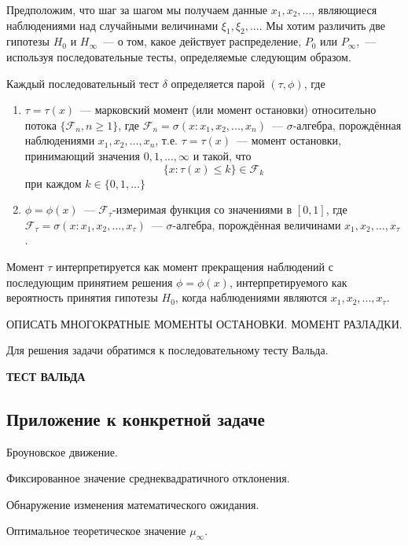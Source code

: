 \documentclass[a4paper,14pt]{article}
\begin{document}
Предположим, что шаг за шагом мы получаем данные $x_1, x_2, ...$, являющиеся наблюдениями над случайными величинами $\xi_1, \xi_2, ...$. Мы хотим различить две гипотезы $H_0$ и $H_\infty$~--- о том, какое действует распределение, $P_0$ или $P_\infty$,~--- используя последовательные тесты, определяемые следующим образом. 

Каждый последовательный тест $\delta$ определяется парой $(\tau, \phi)$, где 

\begin{enumerate}
  \item $\tau = \tau(x)$~--- марковский момент (или момент остановки) относительно потока $\{\mathcal{F}_n, n \ge 1\}$, где $\mathcal{F}_n = \sigma(x: x_1, x_2, ..., x_n)$~--- $\sigma$-алгебра, порождённая наблюдениями $x_1, x_2, ..., x_n$, т.е. $\tau = \tau(x)$~--- момент остановки, принимающий значения $0, 1, ..., \infty$ и такой, что 
  \begin{displaymath}
    \{x: \tau(x) \le k\} \in \mathcal{F}_k
  \end{displaymath}
  при каждом $k \in \{0, 1, ...\}$
  
  \item $\phi = \phi(x)$~--- $\mathcal{F}_\tau$-измеримая функция со значениями в $[0, 1]$, где $\mathcal{F}_\tau = \sigma(x: x_1, x_2, ..., x_\tau)$~--- $\sigma$-алгебра, порождённая величинами $x_1, x_2, ..., x_\tau$.
\end{enumerate}

Момент $\tau$ интерпретируется как момент прекращения наблюдений с последующим принятием решения $\phi = \phi(x)$, интерпретируемого как вероятность принятия гипотезы $H_0$, когда наблюдениями являются $x_1, x_2, ..., x_\tau$.

ОПИСАТЬ МНОГОКРАТНЫЕ МОМЕНТЫ ОСТАНОВКИ. МОМЕНТ РАЗЛАДКИ.

Для решения задачи обратимся к последовательному тесту Вальда.

\textbf{ТЕСТ ВАЛЬДА}

\subsection{Приложение к конкретной задаче}

Броуновское движение. 

Фиксированное значение среднеквадратичного отклонения.

Обнаружение изменения математического ожидания. 

Оптимальное теоретическое значение $\mu_\infty$.
\end{document}
